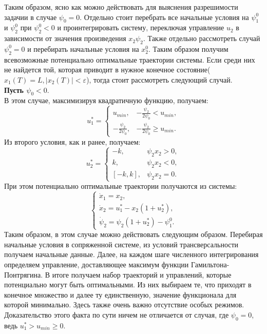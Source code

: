 \documentclass[10pt]{article}
\begin{document}
	Таким образом, ясно как можно действовать для выяснения разрешимости задачии в случае \( \psi_0 = 0\). Отдельно стоит перебрать все начальные условия на \( \psi_1^0 \) и \( \psi_2^0 \) при \( \psi_2^0 < 0 \) и проинтегрировать систему, переключая управление \( u_2 \) в зависимости от значения произведения \( x_2 \psi_2\). Также отдельно рассмотреть случай \( \psi_2^0 = 0 \) и перебирать начальные условия на \( x_2^0 \). Таким образом получим всевозможные потенциально оптимальные траектории системы. Если среди них не найдется той, которая приводит в нужное конечное состояние(\(x_1(T) = L, |x_2(T)| < \varepsilon \)), тогда стоит рассмотреть следующий случай. \medskip \\
	\textbf{Пусть \( \psi_0 < 0 \)}.\medskip \\
	В этом случае, максимизируя квадратичную функцию, получаем:
	\[ u_1^* = \begin{cases}
				u_{min}, & -\frac{\psi_2}{2\psi_0} < u_{min},
				\\
				-\frac{\psi_2}{2\psi_0}, & -\frac{\psi_2}{2 \psi_0} \ge u_{min}.
			\end{cases} \]
	Из второго условия, как и ранее, получаем:
	\[ u_2^* = \begin{cases} 
			-k  , & \psi_2 x_2 > 0 , 
			\\ 
			k  , & \psi_2 x_2 < 0 , 
			\\ 
			[-k, k]  , & \psi_2 x_2 = 0. \end{cases} \]
	При этом потенциально оптимальные траектории получаются из системы:
	\begin{equation}
		\begin{cases}
			\dot{x}_1 = x_2,
			\\
			\dot{x}_2 =  u_1^* - x_2(1 + u_2^*),
			\\
			\dot{\psi}_2 = \psi_2(1 + u_2^*) - \psi_1^0.
		\end{cases}
	\end{equation}
	Таким образом, в этом случае можно действовать следующим образом. Перебирая начальные условия в сопряженной системе, из условий трансверсальности получаем начальные данные. Далее, на каждом шаге численного интегрирования определяем управление, доставляющее максимум функции Гамильтона-Понтрягина. В итоге получаем набор траекторий и управлений, которые потенциально могут быть оптимальными. Из них выбираем те, что приходят в конечное множество и далее ту единственную, значение функционала для которой минимально. Здесь также очень важно отсутствие особых режимов. Доказательство этого факта по сути ничем не отличается от случая, где \( \psi_0 = 0 \), ведь \( u_1^* > u_{min} \ge 0\). 
	 
\end{document}
